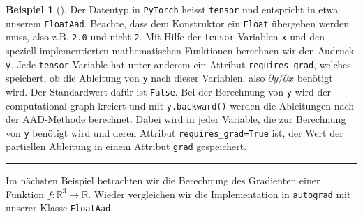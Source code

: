 \documentclass[
  a4paper,
  DIV=11]{scrreprt}
\theoremstyle{definition}
\theoremstyle{definition}
\newtheorem{example}{Beispiel}[chapter]
\theoremstyle{remark}
\begin{document}
\begin{example}[]
Der Datentyp in \texttt{PyTorch} heisst \texttt{tensor} und entspricht
in etwa unserem \texttt{FloatAad}. Beachte, dass dem Konstruktor ein
\texttt{Float} übergeben werden muss, also z.B. \texttt{2.0} und nicht
\texttt{2}. Mit Hilfe der \texttt{tensor}-Variablen \texttt{x} und den
speziell implementierten mathematischen Funktionen berechnen wir den
Audruck \texttt{y}. Jede \texttt{tensor}-Variable hat unter anderem ein
Attribut \texttt{requires\_grad}, welches speichert, ob die Ableitung
von \texttt{y} nach dieser Variablen, also \(\partial y / \partial x\)
benötigt wird. Der Standardwert dafür ist \texttt{False}. Bei der
Berechnung von \texttt{y} wird der computational graph kreiert und mit
\texttt{y.backward()} werden die Ableitungen nach der AAD-Methode
berechnet. Dabei wird in jeder Variable, die zur Berechnung von
\texttt{y} benötigt wird und deren Attribut \texttt{requires\_grad=True}
ist, der Wert der partiellen Ableitung in einem Attribut \texttt{grad}
gespeichert.

\end{example}

\begin{center}\rule{0.5\linewidth}{0.5pt}\end{center}

Im nächsten Beispiel betrachten wir die Berechnung des Gradienten einer
Funktion \(f : \mathbb{R}^3 \rightarrow \mathbb{R}\). Wieder vergleichen
wir die Implementation in \texttt{autograd} mit unserer Klasse
\texttt{FloatAad}.
\end{document}
